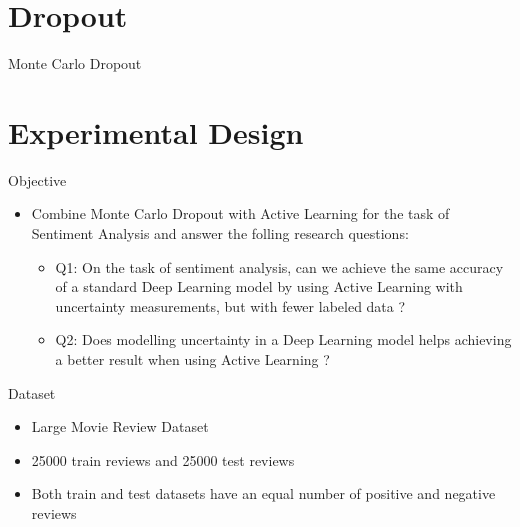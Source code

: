 \documentclass[10pt]{beamer}
\begin{document}
\section{Dropout}

\begin{frame}[fragile]{Monte Carlo Dropout}
    
\end{frame}

\section{Experimental Design}

\begin{frame}[fragile]{Objective}
\begin{itemize}
    \item Combine Monte Carlo Dropout with Active Learning for the task of
        Sentiment Analysis and answer the folling research questions:
        \vspace{0.5cm}

        \begin{itemize}
        \item \alert{Q1}: On the task of sentiment analysis, can we achieve the same
            accuracy of a standard Deep Learning model by using Active Learning
            with uncertainty measurements, but with fewer labeled data ?
        \item \alert{Q2}: Does modelling uncertainty in a Deep Learning model helps
            achieving a better result when using Active Learning ?
        \end{itemize}
    \vspace{0.5cm}
\end{itemize}
\end{frame}

\begin{frame}[fragile]{Dataset}
\begin{itemize}
    \item Large Movie Review Dataset
    \vspace{0.5cm}
    \item 25000 train reviews and 25000 test reviews
    \vspace{0.5cm}
    \item Both train and test datasets have an equal number of positive and
        negative reviews
\end{itemize}
\end{frame}
\end{document}
